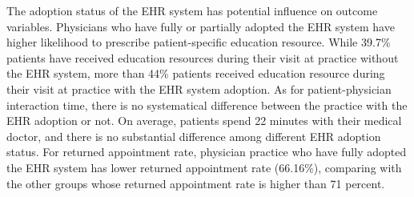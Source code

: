 The adoption status of the EHR system has potential influence on outcome variables. Physicians who have fully or partially adopted the EHR system have higher likelihood to prescribe patient-specific education resource. While 39.7\% patients have received education resources during their visit at practice without the EHR system, more than 44\% patients received education resource during their visit at practice with the EHR system adoption. As for patient-physician interaction time, there is no systematical difference between the practice with the EHR adoption or not. On average, patients spend 22 minutes with their medical doctor, and there is no substantial difference among different EHR adoption status. For returned appointment rate, physician practice who have fully adopted the EHR system has lower returned appointment rate (66.16\%), comparing with the other groups whose returned appointment rate is higher than 71 percent.


